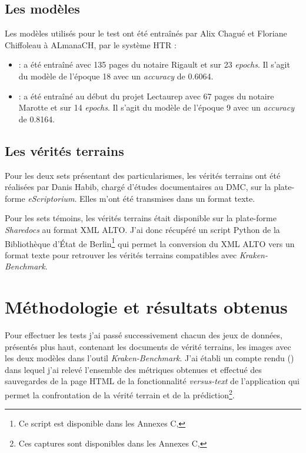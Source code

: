 \subsection{Les modèles} 
Les modèles utilisés pour le test ont été entraînés par Alix Chagué et Floriane Chiffoleau à ALmanaCH, par le système HTR :

\begin{itemize}
    \item {} : a été entraîné avec 135 pages du notaire Rigault et sur 23 \textit{epochs}. Il s'agit du modèle de l'époque 18 avec un \textit{accuracy} de 0.6064.  
    \item {} : a été entraîné au début du projet Lectaurep avec 67 pages du notaire Marotte et sur 14 \textit{epochs}. Il s'agit du modèle de l'époque 9 avec un \textit{accuracy} de 0.8164.
\end{itemize}

\subsection{Les vérités terrains}

Pour les deux sets présentant des particularismes, les vérités terrains ont été réalisées par Danis Habib, chargé d'études documentaires au DMC, sur la plate-forme \textit{eScriptorium}. Elles m'ont été transmises dans un format texte.

Pour les sets témoins, les vérités terrains était disponible sur la plate-forme \textit{Sharedocs} au format XML ALTO. J'ai donc récupéré un script Python de la Bibliothèque d'État de Berlin\footnote{Ce script est disponible dans les Annexes C, } qui permet la conversion du XML ALTO vers un format texte pour retrouver les vérités terrains compatibles avec \textit{Kraken-Benchmark}. \newpage
\section{Méthodologie et résultats obtenus}

Pour effectuer les tests j'ai passé successivement chacun des jeux de données, présentés plus haut, contenant les documents de vérité terrains, les images avec les deux modèles dans l'outil \textit{Kraken-Benchmark}. J'ai établi un compte rendu () dans lequel j'ai relevé l'ensemble des métriques obtenues et effectué des sauvegardes de la page HTML de la fonctionnalité \textit{versus-text} de l'application qui permet la confrontation de la vérité terrain et de la prédiction\footnote{Ces captures sont disponibles dans les Annexes C, }.

